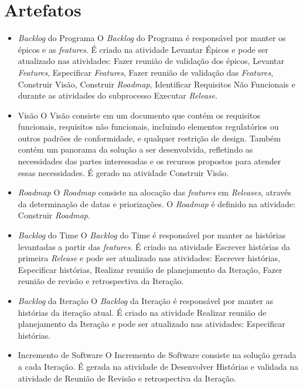 \section{Artefatos}

\begin{itemize}
  \item \textit{Backlog} do Programa
    \subitem O \textit{Backlog} do Programa é responsável por manter os épicos e as \textit{features}. É criado na atividade Levantar Épicos e 
    pode ser atualizado nas atividades: Fazer reunião de validação dos épicos, Levantar \textit{Features}, Especificar \textit{Features}, 
Fazer reunião de validação das \textit{Features}, Construir Visão, Construir \textit{Roadmap}, Identificar Requisitos Não Funcionais e durante as atividades
do subprocesso Executar \textit{Release}.
  
  \item Visão
   \subitem O Visão consiste em um documento que contém os requisitos funcionais, requisitos não funcionais, incluindo elementos regulatórios 
   ou outros padrões de conformidade, e qualquer restrição de design. Também contém um panorama da solução a ser desenvolvida, 
   refletindo as necessidades das partes interessadas e os recursos propostos para atender essas necessidades. É gerado na atividade Construir
   Visão.
  
  \item \textit{Roadmap}
     \subitem O \textit{Roadmap} consiste na alocação das \textit{features} em \textit{Releases}, através da determinação de datas e priorizações. O \textit{Roadmap} é 
     definido na atividade: Construir \textit{Roadmap}.

    
  \item \textit{Backlog} do Time
      \subitem O \textit{Backlog} do Time é responsável por manter as histórias levantadas a partir das \textit{features}. É criado na atividade Escrever 
      histórias da primeira \textit{Release} e pode ser atualizado nas atividades: Escrever histórias, Especificar histórias, Realizar reunião de planejamento 
      da Iteração, Fazer reunião de revisão e retrospectiva da Iteração.
  
  \item \textit{Backlog} da Iteração
        \subitem O \textit{Backlog} da Iteração é responsável por manter as histórias da iteração atual. É criado na atividade Realizar reunião de planejamento 
      da Iteração e pode ser atualizado nas atividades: Especificar histórias.
  
  \item Incremento de Software
      \subitem O Incremento de Software consiste na solução gerada a cada Iteração. É gerada na atividade de Desenvolver Histórias e validada na 
      atividade de Reunião de Revisão e retrospectiva da Iteração.
\end{itemize}
